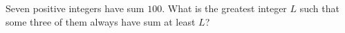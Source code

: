 Seven positive integers have sum $100$. What is the greatest integer $L$ such that some three of them always have sum at least $L$?
